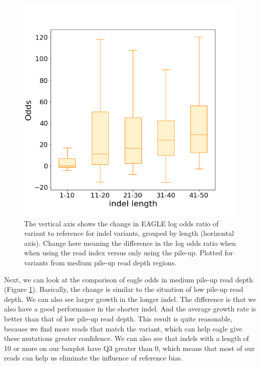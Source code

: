 \begin{figure}[H]
    \centering
    \includegraphics[width=0.6\columnwidth]{body/image/4-10.png}
    \captionsetup{labelfont=bf}
    \renewcommand{\baselinestretch}{1.0}
    \caption[medium pile-up read depth odds change ratio]{The vertical axis shows the change in EAGLE log odds ratio of variant to reference for indel variants, grouped by length (horizontal axis).  Change here meaning the difference in the log odds ratio when when using the read index versus only using the pile-up.  Plotted for variants from medium pile-up read depth regions.}
    \label{f4-10}
\end{figure}

Next, we can look at the comparison of eagle odds in medium pile-up read depth (Figure \ref{f4-10}). Basically, the change is similar to the situation of low pile-up read depth. We can also see larger growth in the longer indel. The difference is that we also have a good performance in the shorter indel. And the average growth rate is better than that of low pile-up read depth. This result is quite reasonable, because we find more reads that match the variant, which can help eagle give these mutations greater confidence.
We can also see that indels with a length of 10 or more on our boxplot have Q3 greater than 0, which means that most of our reads can help us eliminate the influence of reference bias.

